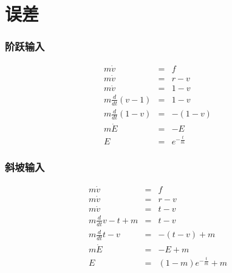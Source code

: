 \documentclass{beamer}
\begin{document}
\section{误差}
\label{sec-4}
\begin{frame}
\frametitle{阶跃输入}
\label{sec-4-1}


\begin{eqnarray*}
 m \dot{v} & =& f\\
 m \dot{v} & =& r-v\\
 m \dot{v} & =& 1-v\\
 m \frac{d}{dt}(v-1) & =& 1-v\\
 m \frac{d}{dt}(1-v) & =& -(1-v)\\
m \dot{E} &=& -E \\
E &=& e^{-\frac{t}{m}}
\end{eqnarray*}
\end{frame}
\begin{frame}
\frametitle{斜坡输入}
\label{sec-4-2}


\begin{eqnarray*}
 m \dot{v} & =& f\\
 m \dot{v} & =& r-v\\
 m \dot{v} & =& t-v\\
 m \frac{d}{dt}{v-t} +m & =& t-v\\
 m \frac{d}{dt}{t-v} & =& -(t-v) +m\\
m \dot{E} &=& -E +m\\
E &=& (1-m)e^{-\frac{t}{m}}+m
\end{eqnarray*}
\end{frame}
\end{document}
